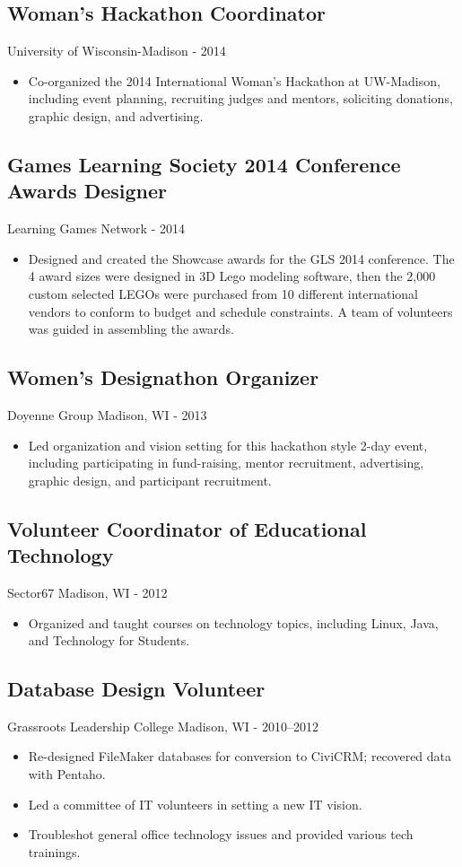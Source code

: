 \documentclass[../main.tex]{subfiles}
\begin{document}
\subsection*{Woman's Hackathon Coordinator}
     University of Wisconsin-Madison - 2014
\begin{itemize}
		\item{Co-organized the 2014 International Woman's Hackathon at UW-Madison, including event planning, recruiting judges and mentors, soliciting donations, graphic design, and advertising.}
	\end{itemize}

\subsection*{Games Learning Society 2014 Conference Awards Designer}
     Learning Games Network - 2014
\begin{itemize}
		\item{Designed and created the Showcase awards for the GLS 2014 conference. The 4 award sizes were designed in 3D Lego modeling software, then the 2,000 custom selected LEGOs were purchased from 10 different international vendors to conform to budget and schedule constraints. A team of volunteers was guided in assembling the awards.}
	\end{itemize}

	\subsection*{Women's Designathon Organizer}{Doyenne Group}
     Madison, WI - 2013
	\begin{itemize}
		\item{Led organization and vision setting for this hackathon style 2-day event, including participating in fund-raising, mentor recruitment, advertising, graphic design, and participant recruitment.}
	\end{itemize}


	\subsection*{Volunteer Coordinator of Educational Technology}{Sector67}
     Madison, WI - 2012
	\begin{itemize}
		\item{Organized and taught courses on technology topics, including Linux, Java, and Technology for Students.}
	\end{itemize}

	\subsection*{Database Design Volunteer}{Grassroots Leadership College}
     Madison, WI - 2010--2012
	\begin{itemize}
		\item{Re-designed FileMaker databases for conversion to CiviCRM; recovered data with Pentaho.}
		\item{Led a committee of IT volunteers in setting a new IT vision.}
		\item{Troubleshot general office technology issues and provided various tech trainings.}
	\end{itemize}
\end{document}
